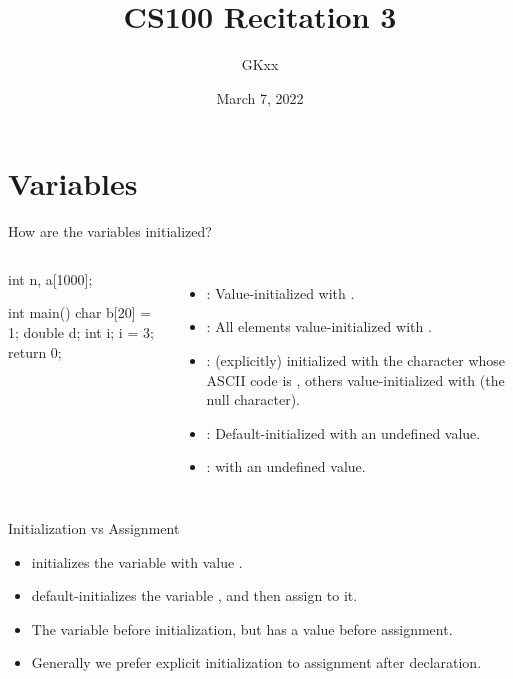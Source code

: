 \documentclass{beamer}
\title{CS100 Recitation 3}
\author{GKxx}
\date{March 7, 2022}
\begin{document}
\begin{frame}
    \maketitle
\end{frame}


\section{Variables}

\begin{frame}[fragile]{How are the variables initialized?}
    \begin{columns}
        \begin{cpp}
int n, a[1000];

int main() {
  char b[20] = {1};
  double d;
  int i;
  i = 3;
  return 0;
}
        \end{cpp}
        \pause
        \begin{itemize}
            \item {}: Value-initialized with .
            \item {}: All elements value-initialized with .
            \item {}:  (explicitly) initialized with the character whose ASCII code is , others value-initialized with  (the null character).
            \item {}: Default-initialized with an undefined value.
            \item {}:  with an undefined value.
        \end{itemize}
    \end{columns}
\end{frame}

\begin{frame}{Initialization vs Assignment}
      
    \pause
    \begin{itemize}
        \item {} initializes the variable  with value .
        \item {} default-initializes the variable , and then assign  to it.
        \pause
        \item The variable  before initialization, but has a value before assignment.
        \item Generally we prefer explicit initialization to assignment after declaration.
    \end{itemize}
\end{frame}
\end{document}
